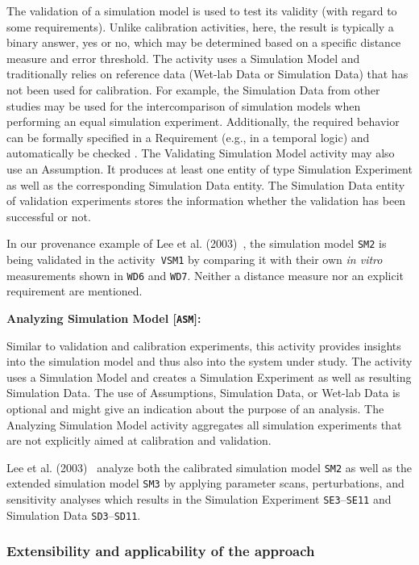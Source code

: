 \documentclass[10pt,letterpaper]{article}
\newcommand{\lee}{Lee et al. (2003)}
\newcommand{\A}{Assumption}
\newcommand{\As}{Assumptions}
\newcommand{\R}{Requirement}
\newcommand{\SM}{Simulation Model}
\newcommand{\SE}{Simulation Experiment}
\newcommand{\SD}{Simulation Data}
\newcommand{\WD}{Wet-lab Data}
\newcommand{\VSM}{Validating Simulation Model}
\newcommand{\ASM}{Analyzing Simulation Model}
\begin{document}
\noindent The validation of a simulation model is used to test its validity (with regard to some requirements).
Unlike calibration activities, here, the result is typically a binary answer, yes or no, which may be determined based on a specific distance measure and error threshold.
The activity uses a \SM{} and traditionally relies on reference data (\WD{} or \SD{}) that has not been used for calibration.
For example, the \SD{} from other studies may be used for the intercomparison of simulation models when performing an equal simulation experiment.
Additionally, the required behavior can be formally specified in a \R{} (e.g., in a temporal logic) and automatically be checked  \cite{Jha2009, Agha2018}.
The \VSM{} activity may also use an \A{}.
It produces at least one entity of type \SE{} as well as the corresponding \SD{} entity.
The \SD{} entity of validation experiments stores the information whether the validation has been successful or not.

In our provenance example of \lee{}~\cite{Lee2003}, the simulation model \texttt{SM2} is being validated in the activity~\texttt{VSM1} by comparing it with their own \textit{in vitro} measurements shown in \texttt{WD6} and \texttt{WD7}.
Neither a distance measure nor an explicit requirement are mentioned.


\textbf{\ASM{} [\texttt{ASM}]:}

\noindent Similar to validation and calibration experiments, this activity provides insights into the simulation model and thus also into the system under study.
The activity uses a \SM{} and creates a \SE{} as well as resulting \SD{}.
The use of \As{}, \SD{}, or \WD{} is optional and might give an indication about the purpose of an analysis.
The \ASM{} activity aggregates all simulation experiments that are not explicitly aimed at calibration and validation.

\lee{}~\cite{Lee2003} analyze both the calibrated simulation model \texttt{SM2} as well as the extended simulation model \texttt{SM3} by applying parameter scans, perturbations, and sensitivity analyses which results in the \SE{} \texttt{SE3}--\texttt{SE11} and \SD{} \texttt{SD3}--\texttt{SD11}.


\subsubsection*{Extensibility and applicability of the approach}
\end{document}
